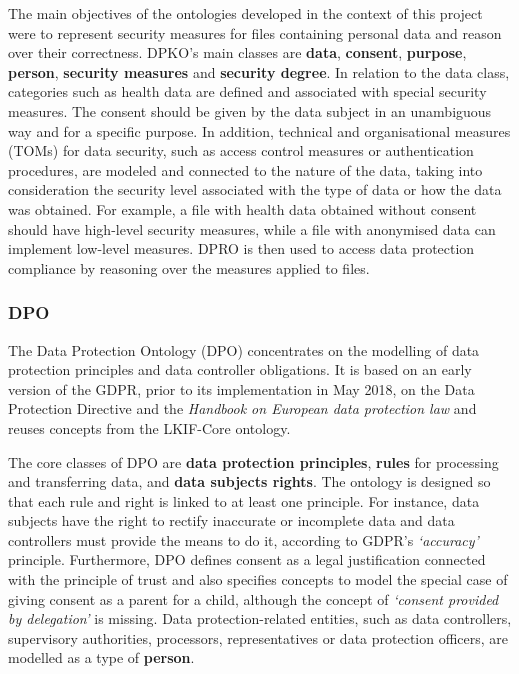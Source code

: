 The main objectives of the ontologies developed in the context of this project were to represent security measures for files containing personal data and reason over their correctness.
DPKO's main classes are \textbf{data}, \textbf{consent}, \textbf{purpose}, \textbf{person}, \textbf{security measures} and \textbf{security degree}.
In relation to the data class, categories such as health data are defined and associated with special security measures. 
The consent should be given by the data subject in an unambiguous way and for a specific purpose.
In addition, technical and organisational measures (TOMs) for data security, such as access control measures or authentication procedures, are modeled and connected to the nature of the data, taking into consideration the security level associated with the type of data or how the data was obtained. 
For example, a file with health data obtained without consent should have high-level security measures, while a file with anonymised data can implement low-level measures.
DPRO is then used to access data protection compliance by reasoning over the measures applied to files.

\subsubsection{DPO}
\label{sec:dpo}

The Data Protection Ontology (DPO) \citep{bartolini_reconciling_2015,otake_using_2017} concentrates on the modelling of data protection principles and data controller obligations. It is based on an early version of the GDPR, prior to its implementation in May 2018, on the Data Protection Directive \citeyearpar{noauthor_directive_1995} and the \textit{Handbook on European data protection law} \citep{european_union_agency_for_fundamental_rights_and_council_of_europe_handbook_2018} and reuses concepts from the LKIF-Core \citep{hoekstra_lkif_2007} ontology.

The core classes of DPO are \textbf{data protection principles}, \textbf{rules} for processing and transferring data, and \textbf{data subjects rights}.
The ontology is designed so that each rule and right is linked to at least one principle.
For instance, data subjects have the right to rectify inaccurate or incomplete data and data controllers must provide the means to do it, according to GDPR's \textit{`accuracy'} principle.
Furthermore, DPO defines consent as a legal justification connected with the principle of trust and also specifies concepts to model the special case of giving consent as a parent for a child, although the concept of \textit{`consent provided by delegation'} is missing.
Data protection-related entities, such as data controllers, supervisory authorities, processors, representatives or data protection officers, are modelled as a type of \textbf{person}.

